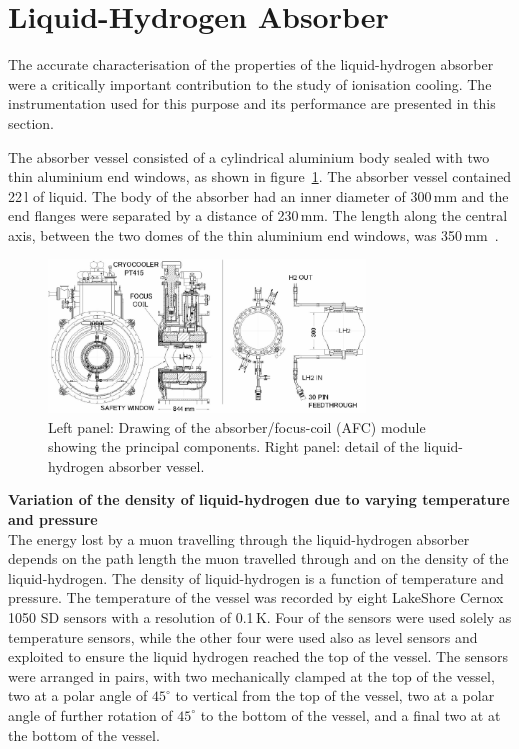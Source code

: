 \graphicspath{{07-Absorber/Figures/}}

\section{Liquid-Hydrogen Absorber}
\label{Sect:Absorber}

The accurate characterisation of the properties of the liquid-hydrogen
absorber were a critically important contribution to the study of
ionisation cooling.
The instrumentation used for this purpose and its performance are
presented in this section.

The absorber vessel consisted of a cylindrical aluminium body sealed
with two thin aluminium end windows, as shown in
figure~\ref{Fig:AbsorberVessel:Diag}.
The absorber vessel contained 22\,l of liquid.
The body of the absorber had an inner diameter of 300\,mm and the end
flanges were separated by a distance of 230\,mm.  
The length along the central axis, between the two domes of the thin
aluminium end windows, was 350\,mm~\cite{1748-0221-13-09-T09008}. \\
\begin{figure}
  \begin{center}
    \includegraphics[width=0.75\textwidth]{AFC-drwng.pdf}
  \end{center}
  \caption{
    Left panel: Drawing of the absorber/focus-coil (AFC) module
    showing the principal components.
    Right panel: detail of the liquid-hydrogen absorber vessel.
  }
  \label{Fig:AbsorberVessel:Diag}
\end{figure}

\noindent\textbf{Variation of the density of liquid-hydrogen due to
    varying temperature and pressure} \\
\noindent
The energy lost by a muon travelling through the liquid-hydrogen
absorber depends on the path length the muon travelled through and on
the density of the liquid-hydrogen. The density of liquid-hydrogen is
a function of temperature and pressure.  
The temperature of the vessel was recorded by eight LakeShore Cernox
1050 SD sensors with a resolution of 0.1\,K. 
Four of the sensors were used solely as temperature sensors, while the
other four were used also as level sensors and exploited to ensure the
liquid hydrogen reached the top of the vessel. 
The sensors were arranged in pairs, with two mechanically clamped at
the top of the vessel, two at a polar angle of ${45}^{\circ}$ to
vertical from the top of the vessel, two at a polar angle of
further rotation of  ${45}^{\circ}$ to the bottom of the vessel, and a
final two at at the bottom of the vessel. 


